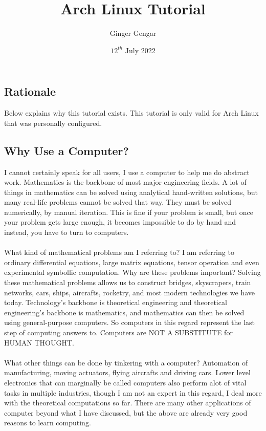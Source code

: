 \documentclass[a4paper, 12pt]{report}
\begin{document}
\title{Arch Linux Tutorial}
\author{Ginger Gengar}
\date{$12^{th}$ July 2022}
\maketitle
\newpage

\tableofcontents
\newpage

\begin{center}
\section{Rationale}

Below explains why this tutorial exists. This tutorial is only valid for Arch Linux that was personally configured. 
\subsection{Why Use a Computer?}

I cannot certainly speak for all users, I use a computer to help me do abstract work. Mathematics is the backbone of most major engineering fields. A lot of things in mathematics can be solved using analytical hand-written solutions, but many real-life problems cannot be solved that way. They must be solved numerically, by manual iteration. This is fine if your problem is small, but once your problem gets large enough, it becomes impossible to do by hand and instead, you have to turn to computers. 
\\~\\What kind of mathematical problems am I referring to? I am referring to ordinary differential equations, large matrix equations, tensor operation and even experimental symbollic computation. Why are these problems important? Solving these mathematical problems allows us to construct bridges, skyscrapers, train networks, cars, ships, aircrafts, rocketry, and most modern technologies we have today. Technology's backbone is theoretical engineering and theoretical engineering's backbone is mathematics, and mathematics can then be solved using general-purpose computers. So computers in this regard represent the last step of computing answers to. Computers are NOT A SUBSTITUTE for HUMAN THOUGHT.
\\~\\What other things can be done by tinkering with a computer? Automation of manufacturing, moving actuators, flying aircrafts and driving cars. Lower level electronics that can marginally be called computers also perform alot of vital tasks in multiple industries, though I am not an expert in this regard, I deal more with the theoretical computations so far. There are many other applications of computer beyond what I have discussed, but the above are already very good reasons to learn computing.


\end{center}
\end{document}
